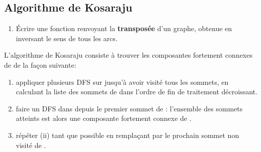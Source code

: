 \documentclass[mp2i]{exam}
\begin{document}
	\subsection{Algorithme de Kosaraju}
	\begin{enumerate}
		\item Écrire une fonction  renvoyant la \textbf{transposée} d'un graphe, obtenue en inversant le sens de tous les arcs.
		\if{}
		\begin{center}
		\end{center}
		\fi
	\end{enumerate}
	L'algorithme de Kosaraju consiste à trouver les composantes fortement connexes de  de la façon suivante:
	\begin{enumerate}[label=(\roman*)]
		\item appliquer plusieurs DFS sur  jusqu'à avoir visité tous les sommets, en calculant la liste  des sommets de  dans l'ordre de fin de traitement décroissant.
		\item faire un DFS dans  depuis le premier sommet  de : l'ensemble des sommets atteints est alors une composante fortement connexe de .
		\item répéter (ii) tant que possible en remplaçant  par le prochain sommet non visité de .
	\end{enumerate}
\end{document}

